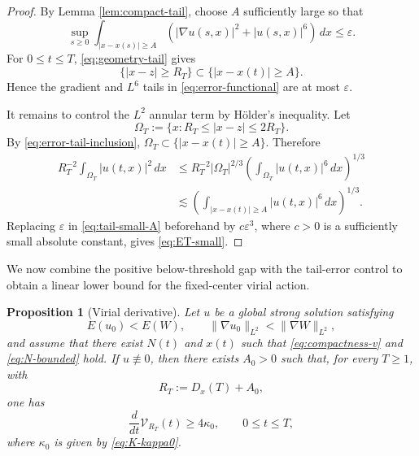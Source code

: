 \documentclass[smallextended,envcountsect,nospthms]{svjour3}
\numberwithin{equation}{section}
\theoremstyle{spbreak}
\newtheorem{proposition}[theorem]{Proposition}
\theoremstyle{spdefbreak}
\theoremstyle{spdefbreak}
\newcommand{\eps}{\varepsilon}
\newcommand{\Vc}{\mathcal V}
\begin{document}
\begin{proof}
By Lemma \ref{lem:compact-tail}, choose $A$ sufficiently large so that
\begin{equation}\label{eq:tail-small-A}
  \sup_{s\ge0}\int_{|x-x(s)|\ge A}
  (|\nabla u(s,x)|^2+|u(s,x)|^6)\,dx\le\eps.
\end{equation}
For $0\le t\le T$, \eqref{eq:geometry-tail} gives
\begin{equation}\label{eq:error-tail-inclusion}
  \{|x-z|\ge R_T\}\subset\{|x-x(t)|\ge A\}.
\end{equation}
Hence the gradient and $L^6$ tails in \eqref{eq:error-functional} are at most $\eps$.

It remains to control the $L^2$ annular term by H\"older's inequality. Let
\begin{equation*}
  \Omega_T:=\{x:R_T\le|x-z|\le2R_T\}.
\end{equation*}
By \eqref{eq:error-tail-inclusion}, $\Omega_T\subset\{|x-x(t)|\ge A\}$. Therefore
\begin{align*}
  R_T^{-2}\int_{\Omega_T}|u(t,x)|^2\,dx
  &\le R_T^{-2}|\Omega_T|^{2/3}
  \left(\int_{\Omega_T}|u(t,x)|^6\,dx\right)^{1/3}\\
  &\lesssim
  \left(\int_{|x-x(t)|\ge A}|u(t,x)|^6\,dx\right)^{1/3}.
\end{align*}
Replacing $\eps$ in \eqref{eq:tail-small-A} beforehand by $c\eps^3$, where $c>0$ is a sufficiently small absolute constant, gives \eqref{eq:ET-small}.
\end{proof}

We now combine the positive below-threshold gap with the tail-error control to obtain a linear lower bound for the fixed-center virial action.

\begin{proposition}[Virial derivative]\label{prop:virial-derivative-lower}
Let $u$ be a global strong solution satisfying
\begin{equation*}
  E(u_0)<E(W),
  \qquad \|\nabla u_0\|_{L^2}<\|\nabla W\|_{L^2},
\end{equation*}
and assume that there exist $N(t)$ and $x(t)$ such that \eqref{eq:compactness-v} and \eqref{eq:N-bounded} hold. If $u\not\equiv0$, then there exists $A_0>0$ such that, for every $T\ge1$, with
\begin{equation*}
  R_T:=D_x(T)+A_0,
\end{equation*}
one has
\begin{equation*}
  \frac{d}{dt}\Vc_{R_T}(t)\ge4\kappa_0,
  \qquad 0\le t\le T,
\end{equation*}
where $\kappa_0$ is given by \eqref{eq:K-kappa0}.
\end{proposition}
\end{document}
